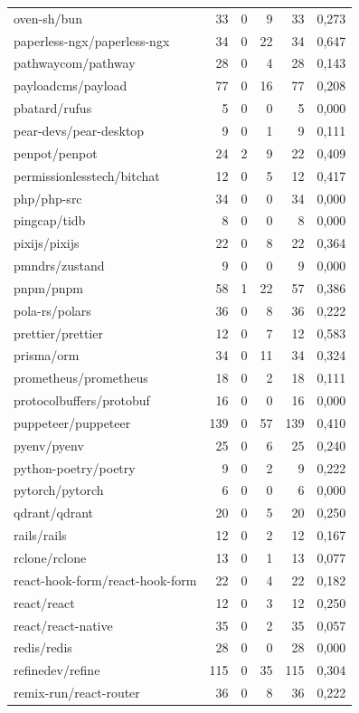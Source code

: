 \begin{tabular}{lrrrrr}
oven-sh/bun & 33 & 0 & 9 & 33 & 0,273 \\
paperless-ngx/paperless-ngx & 34 & 0 & 22 & 34 & 0,647 \\
pathwaycom/pathway & 28 & 0 & 4 & 28 & 0,143 \\
payloadcms/payload & 77 & 0 & 16 & 77 & 0,208 \\
pbatard/rufus & 5 & 0 & 0 & 5 & 0,000 \\
pear-devs/pear-desktop & 9 & 0 & 1 & 9 & 0,111 \\
penpot/penpot & 24 & 2 & 9 & 22 & 0,409 \\
permissionlesstech/bitchat & 12 & 0 & 5 & 12 & 0,417 \\
php/php-src & 34 & 0 & 0 & 34 & 0,000 \\
pingcap/tidb & 8 & 0 & 0 & 8 & 0,000 \\
pixijs/pixijs & 22 & 0 & 8 & 22 & 0,364 \\
pmndrs/zustand & 9 & 0 & 0 & 9 & 0,000 \\
pnpm/pnpm & 58 & 1 & 22 & 57 & 0,386 \\
pola-rs/polars & 36 & 0 & 8 & 36 & 0,222 \\
prettier/prettier & 12 & 0 & 7 & 12 & 0,583 \\
prisma/orm & 34 & 0 & 11 & 34 & 0,324 \\
prometheus/prometheus & 18 & 0 & 2 & 18 & 0,111 \\
protocolbuffers/protobuf & 16 & 0 & 0 & 16 & 0,000 \\
puppeteer/puppeteer & 139 & 0 & 57 & 139 & 0,410 \\
pyenv/pyenv & 25 & 0 & 6 & 25 & 0,240 \\
python-poetry/poetry & 9 & 0 & 2 & 9 & 0,222 \\
pytorch/pytorch & 6 & 0 & 0 & 6 & 0,000 \\
qdrant/qdrant & 20 & 0 & 5 & 20 & 0,250 \\
rails/rails & 12 & 0 & 2 & 12 & 0,167 \\
rclone/rclone & 13 & 0 & 1 & 13 & 0,077 \\
react-hook-form/react-hook-form & 22 & 0 & 4 & 22 & 0,182 \\
react/react & 12 & 0 & 3 & 12 & 0,250 \\
react/react-native & 35 & 0 & 2 & 35 & 0,057 \\
redis/redis & 28 & 0 & 0 & 28 & 0,000 \\
refinedev/refine & 115 & 0 & 35 & 115 & 0,304 \\
remix-run/react-router & 36 & 0 & 8 & 36 & 0,222 \\

\end{tabular}
